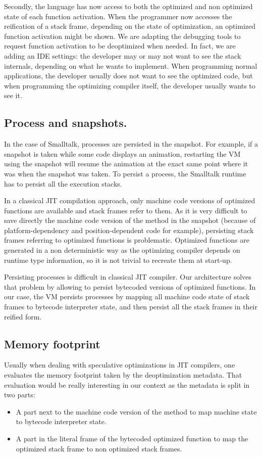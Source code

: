 \documentclass[a4paper,12pt,twoside]{../includes/ThesisStyle}
\begin{document}
Secondly, the language has now access to both the optimized and non optimized state of each function activation. When the programmer now accesses the reification of a stack frame, depending on the state of optimization, an optimized function activation might be shown. We are adapting the debugging tools to request function activation to be deoptimized when needed. In fact, we are adding an IDE settings: the developer may or may not want to see the stack internals, depending on what he wants to implement. When programming normal applications, the developer usually does not want to see the optimized code, but when programming the optimizing compiler itself, the developer usually wants to see it.

\subsection{Process and snapshots.}

In the case of Smalltalk, processes are persisted in the snapshot. For example, if a snapshot is taken while some code displays an animation, restarting the VM using the snapshot will resume the animation at the exact same point where it was when the snapshot was taken. To persist a process, the Smalltalk runtime has to persist all the execution stacks. 

In a classical JIT compilation approach, only machine code versions of optimized functions are available and stack frames refer to them. As it is very difficult to save directly the machine code version of the method in the snapshot (because of platform-dependency and position-dependent code for example), persisting stack frames referring to optimized functions is problematic. Optimized functions are generated in a non deterministic way as the optimizing compiler depends on runtime type information, so it is not trivial to recreate them at start-up.

Persisting processes is difficult in classical JIT compiler. Our architecture solves that problem by allowing to persist bytecoded versions of optimized functions. In our case, the VM persists processes by mapping all machine code state of stack frames to bytecode interpreter state, and then persist all the stack frames in their reified form.

\subsection{Memory footprint}

Usually when dealing with speculative optimizations in JIT compilers, one evaluates the memory footprint taken by the deoptimization metadata. That evaluation would be really interesting in our context as the metadata is split in two parts:
\begin{itemize}
\item A part next to the machine code version of the method to map machine state to bytecode interpreter state.
\item A part in the literal frame of the bytecoded optimized function to map the optimized stack frame to non optimized stack frames.
\end{itemize}
\end{document}
